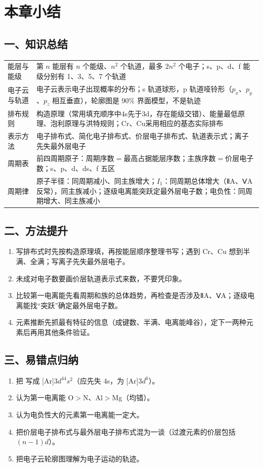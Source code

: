 \documentclass[UTF8,a4paper,zihao=5,oneside,openany,fontset=none]{ctexbook}
\newcommand{\zhangmo}[1]{\par\Needspace{6\baselineskip}\section*{#1}\addcontentsline{toc}{section}{#1}}
\begin{document}
\zhangmo{本章小结}
\subsection*{一、知识总结}
\begin{center}
\small
\begin{tabularx}{\linewidth}{p{2.4cm}X}
\toprule
能层与能级 & 第 $n$ 能层有 $n$ 个能级、$n^2$ 个轨道，最多 $2n^2$ 个电子；s、p、d、f 能级分别有 1、3、5、7 个轨道 \\
电子云与轨道 & 电子云表示电子出现概率的分布；s 轨道球形，p 轨道哑铃形（$p_x$、$p_y$、$p_z$ 相互垂直），轮廓图是 90\% 界面模型，不是轨迹 \\
排布规则 & 构造原理（常用填充顺序中4s先于3d，存在能级交错）、能量最低原理、泡利原理与洪特规则；Cr、Cu采用相应的基态实际排布 \\
表示方法 & 电子排布式、简化电子排布式、价层电子排布式、轨道表示式；离子先失最外层电子 \\
周期表 & 前四周期原子：周期序数$=$最高占据能层序数；主族序数$=$价层电子数；s、p、d、ds、f 五区 \\
周期律 & 原子半径：同周期减小、同主族增大；$I_1$：同周期总体增大（ⅡA、ⅤA 反常），同主族减小；逐级电离能突跃定最外层电子数；电负性：同周期增大、同主族减小 \\
\bottomrule
\end{tabularx}
\end{center}
\subsection*{二、方法提升}
\begin{enumerate}
\item 写排布式时先按构造原理填，再按能层顺序整理书写；遇到 Cr、Cu 想到半满、全满；写离子先失最外层电子。
\item 未成对电子数要画价层轨道表示式来数，不要凭印象。
\item 比较第一电离能先看周期和族的总体趋势，再检查是否涉及ⅡA、ⅤA；逐级电离能找“突跃”确定最外层电子数。
\item 元素推断先抓最有特征的信息（成键数、半满、电离能峰谷），定下一两种元素后再用其他条件验证。
\end{enumerate}
\subsection*{三、易错点归纳}
\begin{enumerate}
\item 把  写成 [Ar]$3d^44s^2$（应先失 4s，为 [Ar]$3d^6$）。
\item 认为第一电离能 O$>$N、Al$>$Mg（均错）。
\item 认为电负性大的元素第一电离能一定大。
\item 把价层电子排布式与最外层电子排布式混为一谈（过渡元素的价层包括 $(n-1)d$）。
\item 把电子云轮廓图理解为电子运动的轨迹。
\end{enumerate}
\end{document}

